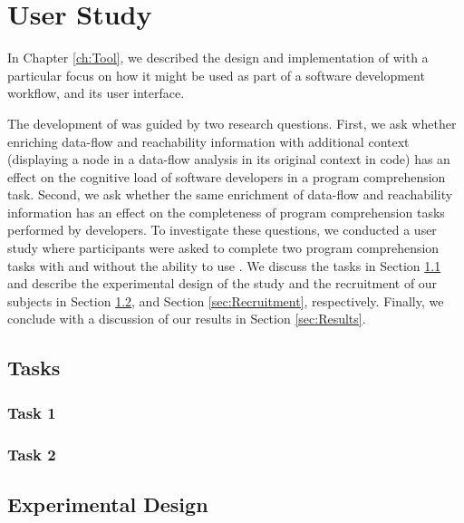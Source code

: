 
\newcommand{\cardamount}{40}

\chapter{User Study}
\label{ch:UserStudy}

In Chapter \ref{ch:Tool}, we described the design and implementation of
\toolname{} with a particular focus on how it might be used as part of a
software development workflow, and its user interface.
\par The development of \toolname{} was guided by two research questions.
First, we ask whether enriching data-flow and reachability information with 
additional context (\eg displaying a node in a data-flow analysis in its 
original context in code) has an effect on the cognitive load of software 
developers in a program comprehension task.
Second, we ask whether the same enrichment of data-flow and reachability
information has an effect on the completeness of program comprehension tasks
performed by developers.
To investigate these questions, we conducted a user study where participants 
were asked to complete two program comprehension tasks with and without the 
ability to use \toolname{}.
We discuss the tasks in Section \ref{sec:Tasks} and describe the experimental
design of the study and the recruitment of our subjects in Section
\ref{sec:ExperimentalDesign}, and Section \ref{sec:Recruitment}, respectively.
Finally, we conclude with a discussion of our results in Section
\ref{sec:Results}.

\section{Tasks}
\label{sec:Tasks}

\subsection{Task 1}
\label{subsec:TaskOne}

\subsection{Task 2}
\label{subsec:TaskTwo}

\section{Experimental Design}
\label{sec:ExperimentalDesign}

